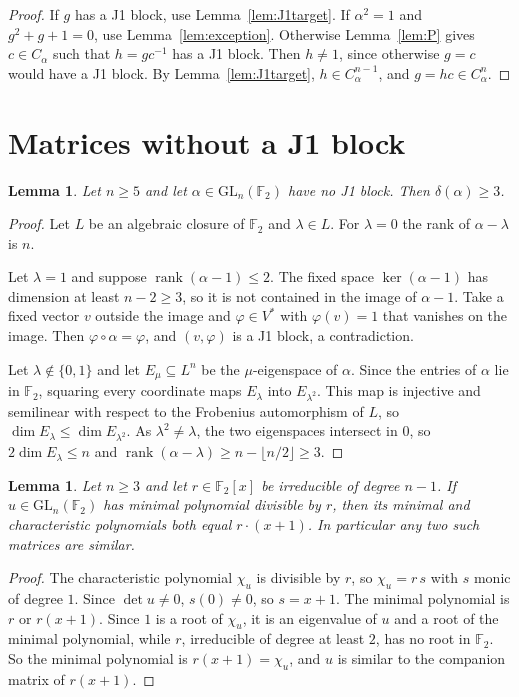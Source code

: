\documentclass[11pt]{amsart}
\newtheorem{lemma}[theorem]{Lemma}
\theoremstyle{definition}
\theoremstyle{remark}
\newcommand{\F}{\mathbb{F}_2}
\newcommand{\GL}{\mathrm{GL}}
\newcommand{\rk}{\operatorname{rank}}
\begin{document}
\begin{proof}
If $g$ has a J1 block, use Lemma~\ref{lem:J1target}. If $\alpha^2=1$ and $g^2+g+1=0$, use
Lemma~\ref{lem:exception}. Otherwise Lemma~\ref{lem:P} gives $c\in C_\alpha$ such that $h=gc^{-1}$
has a J1 block. Then $h\ne1$, since otherwise $g=c$ would have a J1 block. By
Lemma~\ref{lem:J1target}, $h\in C_\alpha^{n-1}$, and $g=hc\in C_\alpha^n$.
\end{proof}

\section{Matrices without a J1 block}\label{sec:noJ1}

\begin{lemma}\label{lem:minrank}
Let $n\ge5$ and let $\alpha\in\GL_n(\F)$ have no J1 block. Then $\delta(\alpha)\ge3$.
\end{lemma}

\begin{proof}
Let $L$ be an algebraic closure of $\F$ and $\lambda\in L$. For $\lambda=0$ the rank of
$\alpha-\lambda$ is $n$.

Let $\lambda=1$ and suppose $\rk(\alpha-1)\le2$. The fixed space $\ker(\alpha-1)$ has dimension at
least $n-2\ge3$, so it is not contained in the image of $\alpha-1$. Take a fixed vector $v$ outside
the image and $\varphi\in V^*$ with $\varphi(v)=1$ that vanishes on the image. Then
$\varphi\circ\alpha=\varphi$, and $(v,\varphi)$ is a J1 block, a contradiction.

Let $\lambda\notin\{0,1\}$ and let $E_\mu\subseteq L^n$ be the $\mu$-eigenspace of $\alpha$. Since
the entries of $\alpha$ lie in $\F$, squaring every coordinate maps $E_\lambda$ into
$E_{\lambda^2}$. This map is injective and semilinear with respect to the Frobenius automorphism
of $L$, so $\dim E_\lambda\le\dim E_{\lambda^2}$. As $\lambda^2\ne\lambda$, the two eigenspaces
intersect in $0$, so $2\dim E_\lambda\le n$ and
$\rk(\alpha-\lambda)\ge n-\lfloor n/2\rfloor\ge3$.
\end{proof}

\begin{lemma}\label{lem:classN}
Let $n\ge3$ and let $r\in\F[x]$ be irreducible of degree $n-1$. If $u\in\GL_n(\F)$ has minimal
polynomial divisible by $r$, then its minimal and characteristic polynomials both equal
$r\cdot(x+1)$. In particular any two such matrices are similar.
\end{lemma}

\begin{proof}
The characteristic polynomial $\chi_u$ is divisible by $r$, so $\chi_u=r\,s$ with $s$ monic of
degree $1$. Since $\det u\ne0$, $s(0)\ne0$, so $s=x+1$. The minimal polynomial is $r$ or
$r(x+1)$. Since $1$ is a root of $\chi_u$, it is an eigenvalue of $u$ and a root of the minimal
polynomial, while $r$, irreducible of degree at least $2$, has no root in $\F$. So the minimal
polynomial is $r(x+1)=\chi_u$, and $u$ is similar to the companion matrix of $r(x+1)$.
\end{proof}
\end{document}

